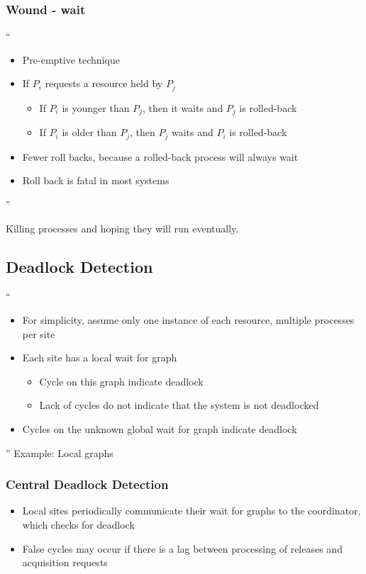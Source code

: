 \documentclass[11pt]{article}
\begin{document}
\subsubsection {Wound - wait }
``
\begin{itemize}
\item Pre-emptive technique
\item If $P_i$ requests a resource held by $P_j$
\begin{itemize}
\item If $P_i$ is younger than $P_j$, then it waits and $P_j$ is rolled-back
\item If $P_i$ is older than $P_j$, then $P_j$ waits and $P_i$ is rolled-back
\end{itemize}
\item Fewer roll backs, because a rolled-back process will always wait
\item Roll back is fatal in most systems
\end{itemize}
''

	
Killing processes and hoping they will run eventually.  

\subsection{Deadlock Detection}
``\begin{itemize}
\item For simplicity, assume only one instance of each resource, multiple processes per site
\item Each site has a local wait for graph
\begin {itemize}
\item Cycle on this graph indicate deadlock
\item Lack of cycles do not indicate that the system is not deadlocked
\end {itemize}
\item Cycles on the unknown global wait for graph indicate deadlock
\end{itemize}
''	
Example: Local graphs

\subsubsection {Central Deadlock Detection}
\begin {itemize}
\item Local sites periodically communicate their wait for graphs to the coordinator, which checks for deadlock
\item False cycles may occur if there is a lag between processing of releases and acquisition requests
\end {itemize}
\end{document}
